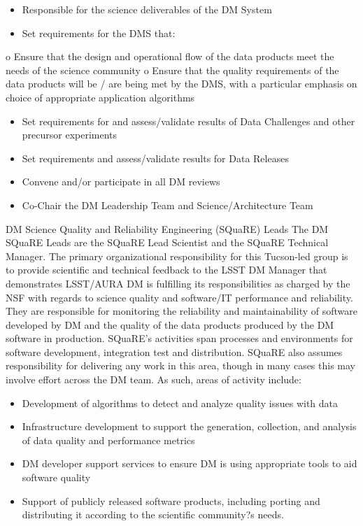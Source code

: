 \begin{itemize}
\item Responsible for the science deliverables of the DM System
\item Set requirements for the DMS that:
\end{itemize}
o Ensure that the design and operational flow of the data products meet the needs of the science community
o Ensure that the quality requirements of the data products will be / are being met by the DMS, with a particular emphasis on choice of appropriate application algorithms
\begin{itemize}
\item Set requirements for and assess/validate results of Data Challenges and other precursor experiments
\item Set requirements and assess/validate results for Data Releases
\item Convene and/or participate in all DM reviews
\item Co-Chair the DM Leadership Team and Science/Architecture Team
\end{itemize}
DM Science Quality and Reliability Engineering (SQuaRE) Leads
The DM SQuaRE Leads are the SQuaRE Lead Scientist and the SQuaRE Technical Manager.  The primary organizational responsibility for this Tucson-led group is to provide scientific and technical feedback to the LSST DM Manager that demonstrates LSST/AURA DM is fulfilling its responsibilities as charged by the NSF with regards to science quality and software/IT performance and reliability.
They are responsible for monitoring the reliability and maintainability of software developed by DM and the quality of the data products produced by the DM software in production. SQuaRE's activities span processes and environments for software development, integration test and distribution.  SQuaRE also assumes responsibility for delivering any work in this area, though in many cases this may involve effort across the DM team. 
As such, areas of activity include:
\begin{itemize}
\item Development of algorithms to detect and analyze quality issues with data
\item Infrastructure development to support the generation, collection, and analysis of data quality and performance metrics
\item DM developer support services to ensure DM is using appropriate tools to aid software quality
\item Support of publicly released software products, including porting and distributing it according to the scientific community?s needs.
\end{itemize}

